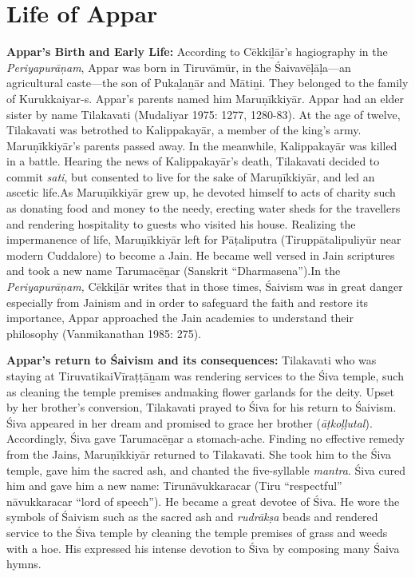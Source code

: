 \section*{Life of Appar}

\textbf{Appar’s Birth and Early Life:} According to Cēkkiḻār’s hagiography in the \textit{Periyapurāņam}, Appar was born in Tiruvāmūr, in the Śaivavēḷāḷa—an agricultural caste—the son of Pukaḻaṉār and Mātiṉi. They belonged to the family of Kurukkaiyar-s. Appar’s parents named him Maruṇīkkiyār. Appar had an elder sister by name Tilakavati (Mudaliyar 1975: 1277, 1280-83). At the age of twelve, Tilakavati was betrothed to Kalippakayār, a member of the king’s army. Maruṇīkkiyār’s parents passed away. In the meanwhile, Kalippakayār was killed in a battle. Hearing the news of Kalippakayār’s death, Tilakavati decided to commit \textit{sati}, but consented to live for the sake of Maruṇīkkiyār, and led an ascetic life.As Maruṇīkkiyār grew up, he devoted himself to acts of charity such as donating food and money to the needy, erecting water sheds for the travellers and rendering hospitality to guests who visited his house. Realizing the impermanence of life, Maruṇīkkiyār left for Pāṭaliputra (Tiruppātalipuliyūr near modern Cuddalore) to become a Jain. He became well versed in Jain scriptures and took a new name Tarumacēṉar (Sanskrit “Dharmasena”).In the \textit{Periyapurāņam, }Cēkkiḻār writes that in those times, Śaivism was in great danger especially from Jainism and in order to safeguard the faith and restore its importance, Appar approached the Jain academies to understand their philosophy (Vanmikanathan 1985: 275). 

\textbf{Appar’s return to Śaivism and its consequences:} Tilakavati who was staying at TiruvatikaiVīraṭṭāṉam was rendering services to the Śiva temple, such as cleaning the temple premises andmaking flower garlands for the deity. Upset by her brother’s conversion, Tilakavati prayed to Śiva for his return to Śaivism. Śiva appeared in her dream and promised to grace her brother (\textit{āṭkoḷḷutal}). Accordingly, Śiva gave Tarumacēṉar a stomach-ache. Finding no effective remedy from the Jains, Maruṇīkkiyār returned to Tilakavati. She took him to the Śiva temple, gave him the sacred ash, and chanted the five-syllable \textit{mantra}. Śiva cured him and gave him a new name: Tirunāvukkaracar (Tiru “respectful” nāvukkaracar “lord of speech”). He became a great devotee of Śiva. He wore the symbols of Śaivism such as the sacred ash and \textit{rudrākṣa} beads and rendered service to the Śiva temple by cleaning the temple premises of grass and weeds with a hoe. His expressed his intense devotion to Śiva by composing many Śaiva hymns.

